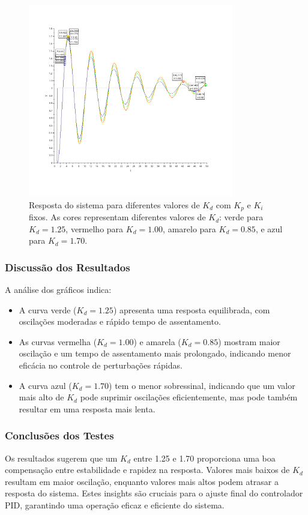\begin{figure}[H]
    \centering
    \includegraphics[width=0.8\textwidth]{6-atividade/assets/pid-ajustando-kd.png}
    \caption{Resposta do sistema para diferentes valores de \( K_d \) com \( K_p \) e \( K_i \) fixos. As cores representam diferentes valores de \( K_d \): verde para \( K_d = 1.25 \), vermelho para \( K_d = 1.00 \), amarelo para \( K_d = 0.85 \), e azul para \( K_d = 1.70 \).}
    \label{fig:response-various-kd}
\end{figure}

\subsubsection{Discussão dos Resultados}
A análise dos gráficos indica:
\begin{itemize}
    \item A curva verde (\( K_d = 1.25 \)) apresenta uma resposta equilibrada, com oscilações moderadas e rápido tempo de assentamento.
    \item As curvas vermelha (\( K_d = 1.00 \)) e amarela (\( K_d = 0.85 \)) mostram maior oscilação e um tempo de assentamento mais prolongado, indicando menor eficácia no controle de perturbações rápidas.
    \item A curva azul (\( K_d = 1.70 \)) tem o menor sobressinal, indicando que um valor mais alto de \( K_d \) pode suprimir oscilações eficientemente, mas pode também resultar em uma resposta mais lenta.
\end{itemize}

\subsubsection{Conclusões dos Testes}
Os resultados sugerem que um \( K_d \) entre 1.25 e 1.70 proporciona uma boa compensação entre estabilidade e rapidez na resposta. Valores mais baixos de \( K_d \) resultam em maior oscilação, enquanto valores mais altos podem atrasar a resposta do sistema. Estes insights são cruciais para o ajuste final do controlador PID, garantindo uma operação eficaz e eficiente do sistema.
